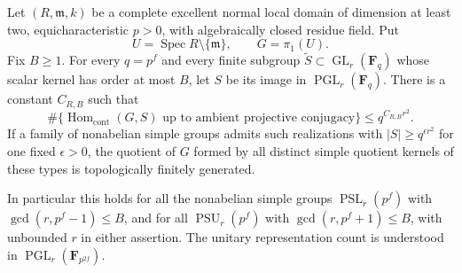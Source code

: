 \begin{corollary}
\label{D:local-bounded-scalar-simple-product}
Let $(R,\mathfrak m,k)$ be a complete excellent normal local
domain of dimension at least two, equicharacteristic $p>0$, with
algebraically closed residue field. Put
\[
          U=\operatorname{Spec}R\setminus\{\mathfrak m\},
          \qquad G=\pi_1(U).
\]
Fix $B\ge1$. For every $q=p^f$ and every finite subgroup
$\widetilde S\subset\operatorname{GL}_r(\mathbf F_q)$ whose
scalar kernel has order at most $B$, let $S$ be its image in
$\operatorname{PGL}_r(\mathbf F_q)$. There is a constant
$C_{R,B}$ such that
\[
 \#\{\operatorname{Hom}_{\mathrm{cont}}(G,S)
            \text{ up to ambient projective conjugacy}\}
                  \le q^{C_{R,B}r^2}.                  \tag{D.LSC.1}
\]
If a family of nonabelian simple groups admits such realizations
with $|S|\ge q^{\epsilon r^2}$ for one fixed $\epsilon>0$, the
quotient of $G$ formed by all distinct simple quotient kernels
of these types is topologically finitely generated.

In particular this holds for all the nonabelian simple groups
$\operatorname{PSL}_r(p^f)$ with $\gcd(r,p^f-1)\le B$, and
for all $\operatorname{PSU}_r(p^f)$ with
$\gcd(r,p^f+1)\le B$, with unbounded $r$ in either assertion.
The unitary representation count is understood in
$\operatorname{PGL}_r(\mathbf F_{p^{2f}})$.
\end{corollary}
